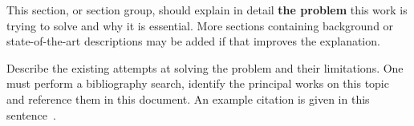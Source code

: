 This section, or section group, should explain in detail {\bf the problem} this
work is trying to solve and why it is essential. More sections containing
background or state-of-the-art descriptions may be added if that improves the
explanation.



Describe the existing attempts at solving the problem and their limitations. One
must perform a bibliography search, identify the principal works on this topic
and reference them in this document. An example citation is given in this
sentence~\cite{Lopes2017}.
